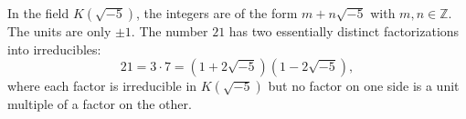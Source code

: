 In the field $K(\sqrt{-5})$, the integers are of the form $m + n\sqrt{-5}$ with $m, n \in \mathbb{Z}$. The units are only $\pm 1$. The number $21$ has two essentially distinct factorizations into irreducibles:
$$21 = 3 \cdot 7 = (1 + 2\sqrt{-5})(1 - 2\sqrt{-5}),$$
where each factor is irreducible in $K(\sqrt{-5})$ but no factor on one side is a unit multiple of a factor on the other.
